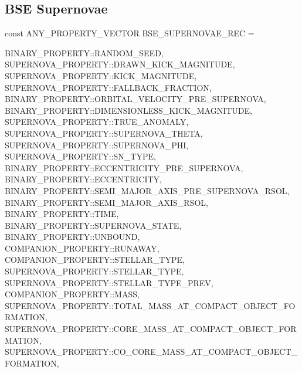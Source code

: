 \newpage
\subsection{BSE Supernovae}\label{sec:BSESupernovae}

const ANY\_PROPERTY\_VECTOR BSE\_SUPERNOVAE\_REC = \lcb

\hfill
\begin{minipage}{\dimexpr\textwidth-2em}
    BINARY\_PROPERTY::RANDOM\_SEED, \\
    SUPERNOVA\_PROPERTY::DRAWN\_KICK\_MAGNITUDE, \\
    SUPERNOVA\_PROPERTY::KICK\_MAGNITUDE, \\
    SUPERNOVA\_PROPERTY::FALLBACK\_FRACTION, \\
    BINARY\_PROPERTY::ORBITAL\_VELOCITY\_PRE\_SUPERNOVA, \\
    BINARY\_PROPERTY::DIMENSIONLESS\_KICK\_MAGNITUDE,  \\
    SUPERNOVA\_PROPERTY::TRUE\_ANOMALY, \\
    SUPERNOVA\_PROPERTY::SUPERNOVA\_THETA, \\
    SUPERNOVA\_PROPERTY::SUPERNOVA\_PHI, \\
    SUPERNOVA\_PROPERTY::SN\_TYPE, \\
    BINARY\_PROPERTY::ECCENTRICITY\_PRE\_SUPERNOVA,   \\
	BINARY\_PROPERTY::ECCENTRICITY, \\
    BINARY\_PROPERTY::SEMI\_MAJOR\_AXIS\_PRE\_SUPERNOVA\_RSOL, \\
	BINARY\_PROPERTY::SEMI\_MAJOR\_AXIS\_RSOL, \\
    BINARY\_PROPERTY::TIME, \\
    BINARY\_PROPERTY::SUPERNOVA\_STATE, \\
    BINARY\_PROPERTY::UNBOUND, \\
    COMPANION\_PROPERTY::RUNAWAY, \\
    COMPANION\_PROPERTY::STELLAR\_TYPE, \\
    SUPERNOVA\_PROPERTY::STELLAR\_TYPE, \\
    SUPERNOVA\_PROPERTY::STELLAR\_TYPE\_PREV, \\
    COMPANION\_PROPERTY::MASS, \\
    SUPERNOVA\_PROPERTY::TOTAL\_MASS\_AT\_COMPACT\_OBJECT\_FORMATION, \\
    SUPERNOVA\_PROPERTY::CORE\_MASS\_AT\_COMPACT\_OBJECT\_FORMATION, \\
    SUPERNOVA\_PROPERTY::CO\_CORE\_MASS\_AT\_COMPACT\_OBJECT\_FORMATION, \\

\end{minipage}
